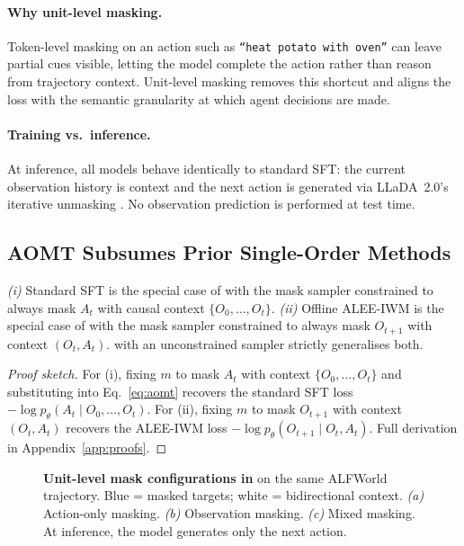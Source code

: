 \paragraph{Why unit-level masking.}
Token-level masking on an action such as \texttt{``heat potato with oven''} can
leave partial cues visible, letting the model complete the action rather than
reason from trajectory context. Unit-level masking removes this shortcut and
aligns the loss with the semantic granularity at which agent decisions are made.

\paragraph{Training vs.\ inference.}
At inference, all \aomt{} models behave identically to standard SFT: the current
observation history is context and the next action is generated via LLaDA~2.0's
iterative unmasking \citep{bie2025llada20}. No observation prediction is
performed at test time.

\subsection{AOMT Subsumes Prior Single-Order Methods}

\begin{proposition}[Subsumption]
\label{prop:subsumption}
\emph{(i)} Standard SFT is the special case of \aomt{} with the mask sampler
constrained to always mask $A_t$ with causal context $\{O_0,\ldots,O_t\}$.
\emph{(ii)} Offline ALEE-IWM is the special case of \aomt{} with the mask
sampler constrained to always mask $O_{t+1}$ with context $(O_t, A_t)$.
\aomt{} with an unconstrained sampler strictly generalises both.
\end{proposition}

\begin{proof}[Proof sketch]
For (i), fixing $m$ to mask $A_t$ with context $\{O_0,\ldots,O_t\}$ and
substituting into Eq.~\eqref{eq:aomt} recovers the standard SFT loss
$-\log p_\theta(A_t \mid O_0,\ldots,O_t)$.
For (ii), fixing $m$ to mask $O_{t+1}$ with context $(O_t,A_t)$ recovers
the ALEE-IWM loss $-\log p_\theta(O_{t+1} \mid O_t,A_t)$.
Full derivation in Appendix~\ref{app:proofs}.
\end{proof}

\begin{figure}[t]
  \centering
  
  \caption{%
    \textbf{Unit-level mask configurations in \aomt{}} on the same ALFWorld
    trajectory.
    Blue = masked targets; white = bidirectional context.
    \emph{(a)} Action-only masking.
    \emph{(b)} Observation masking.
    \emph{(c)} Mixed masking.
    At inference, the model generates only the next action.
  }
  \label{fig:mask_illustration}
\end{figure}

